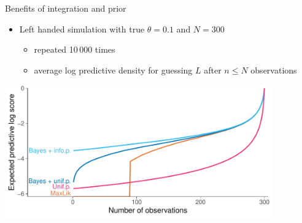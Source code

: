 \documentclass[english,t]{beamer}
\begin{document}


\begin{frame}{Benefits of integration and prior}

  \begin{itemize}
  \item Left handed simulation with true $\theta=0.1$ and $N=300$
    \begin{itemize}
    \item repeated 10\,000 times
    \item average log predictive density for guessing $L$ after $n \leq N$ observations
    \end{itemize}
  \end{itemize}
  
  \hspace{-1cm}\includegraphics[width=11.5cm]{figs/lefthand_simulation_logscore_new.pdf}

\end{frame}


\end{document}

